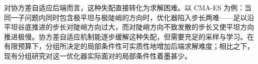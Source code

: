对协方差自适应后端而言，这种失配直接转化为求解困难。以 CMA-ES 为例：当同一子问题内同时包含极平坦与极陡峭的方向时，优化器陷入步长两难——足以沿平坦谷底推进的步长对陡峭方向过大，而对陡峭方向不致发散的步长又使平坦方向推进极慢。协方差自适应机制能逐步缓解这种失配，但需要充足的采样与学习。在有限预算下，分组所决定的局部条件性可实质性地增加后端求解难度；相比之下，现有分组研究对这一优化器实际面对的局部条件性着墨甚少。